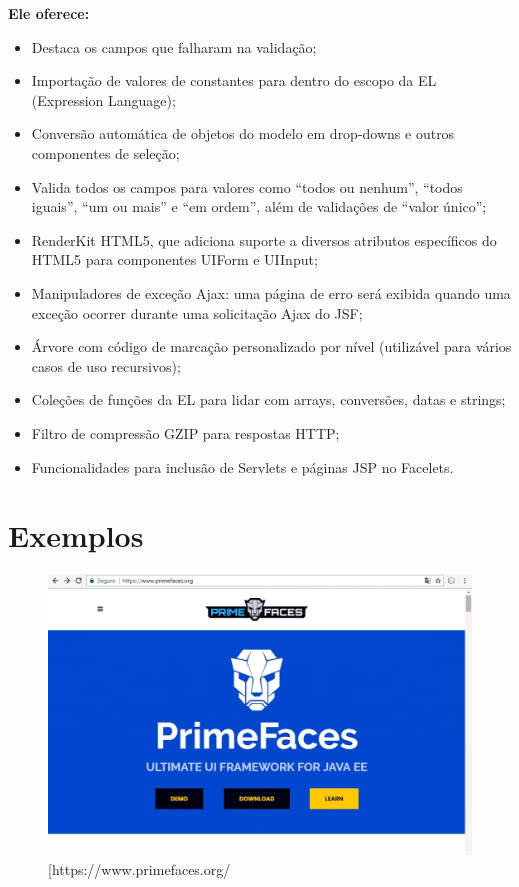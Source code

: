 \documentclass[12pt,a4paper]{article}
\begin{document}
\textbf{Ele oferece:}
\begin{itemize}
\item Destaca os campos que falharam na validação;

\item Importação de valores de constantes para dentro do escopo da EL (Expression Language);

\item Conversão automática de objetos do modelo em drop-downs e outros componentes de seleção;

\item Valida todos os campos para valores como “todos ou nenhum”, “todos iguais”, “um ou mais” e “em ordem”, além de validações de “valor único”;

\item RenderKit HTML5, que adiciona suporte a diversos atributos específicos do HTML5 para componentes UIForm e UIInput;

\item Manipuladores de exceção Ajax: uma página de erro será exibida quando uma exceção ocorrer durante uma solicitação Ajax do JSF;

\item Árvore com código de marcação personalizado por nível (utilizável para vários casos de uso recursivos);

\item Coleções de funções da EL para lidar com arrays, conversões, datas e strings;

\item Filtro de compressão GZIP para respostas HTTP;

\item Funcionalidades para inclusão de Servlets e páginas JSP no Facelets.

\end{itemize}

\vspace{5cm}

\section{Exemplos}

\noindent \begin{figure}[h] \label{Figura:PrimeFaces} \caption{[https://www.primefaces.org/} \centering \includegraphics[width=17cm]{recursos/imagens/img01.png}\end{figure}
\end{document}
